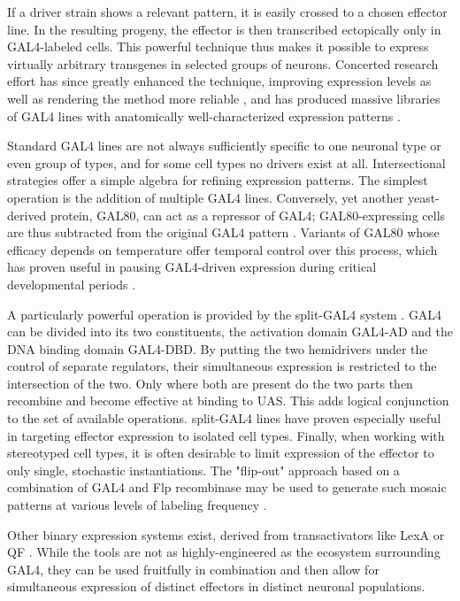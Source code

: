 If a driver strain shows a relevant pattern, it is easily crossed to a chosen effector line. In the resulting progeny, the effector is then transcribed ectopically only in GAL4-labeled cells. This powerful technique thus makes it possible to express virtually arbitrary transgenes in selected groups of neurons. Concerted research effort has since greatly enhanced the technique, improving expression levels as well as rendering the method more reliable \citep{Pfeiffer:2010aa,Pfeiffer:2012bu}, and has produced massive libraries of GAL4 lines with anatomically well-characterized expression patterns \citep{Pfeiffer:2008aa,Jenett:2012aa,Kvon:2014aa}.

Standard GAL4 lines are not always sufficiently specific to one neuronal type or even group of types, and for some cell types no drivers exist at all. Intersectional strategies offer a simple algebra for refining expression patterns. The simplest operation is the addition of multiple GAL4 lines. Conversely, yet another yeast-derived protein, GAL80, can act as a repressor of GAL4; GAL80-expressing cells are thus subtracted from the original GAL4 pattern \citep{Lee:1999aa}. Variants of GAL80 whose efficacy depends on temperature offer temporal control over this process, which has proven useful in pausing GAL4-driven expression during critical developmental periods \citep{McGuire:2003aa}.

A particularly powerful operation is provided by the split-GAL4 system \citep{Luan:2006aa}. GAL4 can be divided into its two constituents, the activation domain GAL4-AD and the DNA binding domain GAL4-DBD. By putting the two hemidrivers under the control of separate regulators, their simultaneous expression is restricted to the intersection of the two. Only where both are present do the two parts then recombine and become effective at binding to UAS. This adds logical conjunction to the set of available operations. split-GAL4 lines have proven especially useful in targeting effector expression to isolated cell types. Finally, when working with stereotyped cell types, it is often desirable to limit expression of the effector to only single, stochastic instantiations. The "flip-out" approach based on a combination of GAL4 and Flp recombinase may be used to generate such mosaic patterns at various levels of labeling frequency \citep{Golic:1989aa,Struhl:1993aa,Bohm:2010aa}.

Other binary expression systems exist, derived from transactivators like LexA \citep{Lai:2006aa} or QF \citep{Potter:2010aa}. While the tools are not as highly-engineered as the ecosystem surrounding GAL4, they can be used fruitfully in combination and then allow for simultaneous expression of distinct effectors in distinct neuronal populations.

